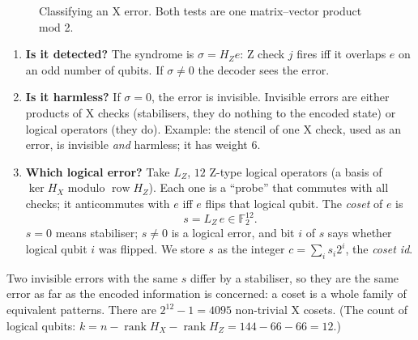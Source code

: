 \documentclass[11pt]{article}
\newcommand{\F}{\mathbb{F}_2}
\newcommand{\rowsp}{\operatorname{row}}
\newcommand{\rk}{\operatorname{rank}}
\begin{document}
\begin{figure}[h]
\centering
{}
\caption{Classifying an X error. Both tests are one matrix--vector product mod 2.}
\label{fig:flow}
\end{figure}

\begin{enumerate}
\item \textbf{Is it detected?} The syndrome is $\sigma = H_Z e$: Z check $j$ fires iff it
      overlaps $e$ on an odd number of qubits. If $\sigma\neq 0$ the decoder sees the
      error.
\item \textbf{Is it harmless?} If $\sigma = 0$, the error is invisible. Invisible errors are
      either products of X checks (stabilisers, they do nothing to the encoded state) or
      logical operators (they do). Example: the stencil of one X check, used as an error, is
      invisible \emph{and} harmless; it has weight 6.
\item \textbf{Which logical error?} Take $L_Z$, $12$ Z-type logical operators
      (a basis of $\ker H_X$ modulo $\rowsp H_Z$). Each one is a ``probe'' that commutes
      with all checks; it anticommutes with $e$ iff $e$ flips that logical qubit. The
      \emph{coset} of $e$ is
      \[ s = L_Z\, e \in \F^{12}. \]
      $s=0$ means stabiliser; $s\neq 0$ is a logical error, and bit $i$ of $s$ says whether
      logical qubit $i$ was flipped. We store $s$ as the integer $c=\sum_i s_i 2^i$, the
      \emph{coset id}.
\end{enumerate}

Two invisible errors with the same $s$ differ by a stabiliser, so they are the same error as
far as the encoded information is concerned: a coset is a whole family of equivalent
patterns. There are $2^{12}-1 = 4095$ non-trivial X cosets. (The count of logical qubits:
$k = n - \rk H_X - \rk H_Z = 144-66-66 = 12$.)
\end{document}
